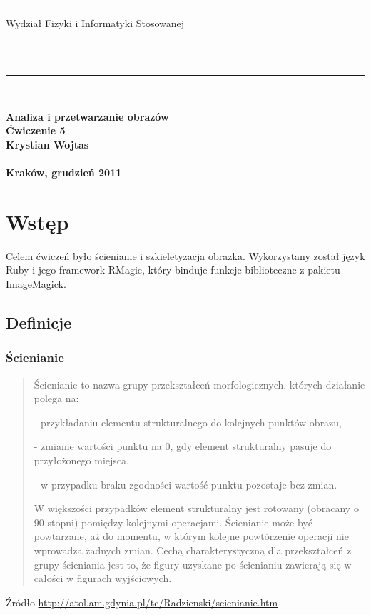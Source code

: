 \documentclass[a4paper,12pt]{article}
\begin{document}
\rule{26mm}{0pt}
{\large\textsf{Wydział Fizyki i Informatyki Stosowanej}}\\
\rule{\textwidth}{3pt}\\
\rule[2ex]
{\textwidth}{1pt}\\
\vspace{7ex}
\begin{center}
{\bf\LARGE\textsf{Analiza i przetwarzanie obrazów}}\\
\vspace{13ex}
{\bf\huge\textsf{Ćwiczenie 5}}\\
\vspace{3ex}
{\sf \small } {\bf\small\textsf{Krystian Wojtas}}\\
\vspace{14ex}
{\sf \Large } {\bf\Large\textsf{}}\\
\vspace{22ex}
\textsf{\bf\large\textsf{Kraków, grudzień 2011}}
\end{center}


\newpage
\section{Wstęp}
Celem ćwiczeń było ścienianie i szkieletyzacja obrazka. Wykorzystany został język Ruby i jego framework RMagic, który binduje funkcje biblioteczne z pakietu ImageMagick.


\subsection{Definicje}

\subsubsection{Ścienianie}
\begin{quote}
Ścienianie to nazwa grupy przekształceń morfologicznych, których działanie polega na:

- przykładaniu elementu strukturalnego do kolejnych punktów obrazu,

- zmianie wartości punktu na 0, gdy element strukturalny pasuje do przyłożonego miejsca,

- w przypadku braku zgodności wartość punktu pozostaje bez zmian.

W większości przypadków element strukturalny jest rotowany (obracany o 90 stopni) pomiędzy kolejnymi operacjami. Ścienianie może być powtarzane, aż do momentu, w którym kolejne powtórzenie operacji nie wprowadza żadnych zmian. Cechą charakterystyczną dla przekształceń z grupy ścieniania jest to, że figury uzyskane po ścienianiu zawierają się w całości w figurach wyjściowych. 
\end{quote}
Źródło \url{http://atol.am.gdynia.pl/tc/Radzienski/scienianie.htm}
\end{document}
